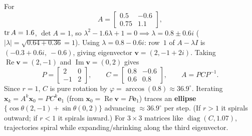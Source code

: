 \documentclass[10pt]{scrartcl}
\newcommand{\vv}[1]{\mathbf{#1}}
\begin{document}
\begin{example*}
  For
  \[
    A = \begin{bmatrix}0.5&-0.6\\0.75&1.1\end{bmatrix},
  \]
  $\operatorname{tr} A=1.6$, $\det A=1$, so $\lambda^2-1.6\lambda+1=0 \implies \lambda=0.8\pm 0.6i$ ($|\lambda|=\sqrt{0.64+0.36}=1$). Using $\lambda=0.8-0.6i$: row~$1$ of $A-\lambda I$ is $(-0.3+0.6i,\ -0.6)$, giving eigenvector $\vv v=(2,-1+2i)$. Taking $\operatorname{Re}\vv v=(2,-1)$ and $\operatorname{Im}\vv v=(0,2)$ gives
  \[
    P=\begin{bmatrix}2&0\\-1&2\end{bmatrix},\qquad
    C=\begin{bmatrix}0.8&-0.6\\0.6&0.8\end{bmatrix},\qquad
    A=PCP^{-1}.
  \]
  Since $r=1$, $C$ is pure rotation by $\varphi=\arccos(0.8)\approx 36.9^\circ$. Iterating $\vv x_k=A^k\vv x_0 = P C^k\vv e_1$ (from $\vv x_0=\operatorname{Re}\vv v=P\vv e_1$) traces an \textbf{ellipse} $\{\cos\theta(2,-1)+\sin\theta(0,2)\}$ advancing $\approx 36.9^\circ$ per step. (If $r>1$ it spirals outward; if $r<1$ it spirals inward.) For $3\times3$ matrices like $\operatorname{diag}(C,1.07)$, trajectories spiral while expanding/shrinking along the third eigenvector.
\end{example*}
\end{document}
